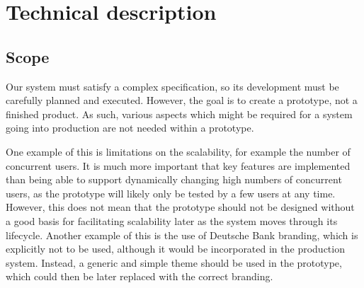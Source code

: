 \documentclass[10pt]{article}
\begin{document}
\section{Technical description}

\subsection{Scope}
Our system must satisfy a complex specification, so its development must be
carefully planned and executed. However, the goal is to create a prototype, not
a finished product. As such, various aspects which might be required for a
system going into production are not needed within a prototype.

One example of this is limitations on the scalability, for example the number of
concurrent users. It is much more important that key features are implemented
than being able to support dynamically changing high numbers of concurrent
users, as the prototype will likely only be tested by a few users at any time.
However, this does not mean that the prototype should not be designed without a
good basis for facilitating scalability later as the system moves through its
lifecycle. Another example of this is the use of Deutsche Bank branding, which
is explicitly not to be used, although it would be incorporated in the
production system. Instead, a generic and simple theme should be used in the
prototype, which could then be later replaced with the correct branding.
\end{document}
